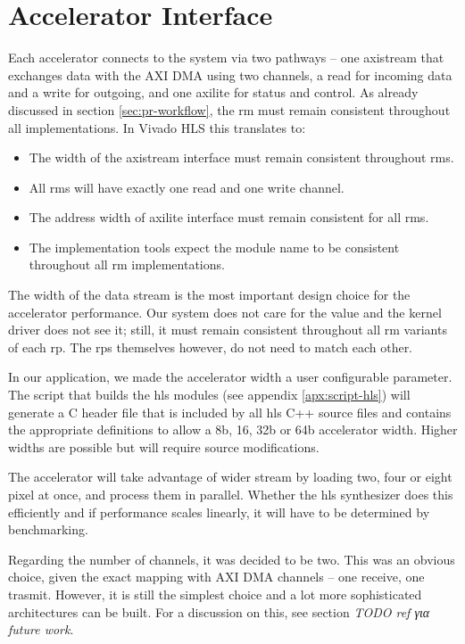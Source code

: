\section{Accelerator Interface}

Each accelerator connects to the system via two pathways -- one \gls{axistream} that 
exchanges data with the AXI DMA using two channels, a read for incoming data and
a write for outgoing, and one \gls{axilite} for status and control.
As already discussed in section \ref{sec:pr-workflow}, the \gls{rm} must remain
consistent throughout all implementations. In Vivado HLS this translates to:

\begin{itemize}
\item	The width of the \gls{axistream} interface must remain consistent throughout \glspl{rm}.
\item	All \glspl{rm} will have exactly one read and one write channel. 
\item	The address width of \gls{axilite} interface must remain consistent for all \glspl{rm}.
\item	The implementation tools expect the module name to be consistent throughout
	all \gls{rm} implementations.
\end{itemize}

The width of the data stream is the most important design choice for the accelerator performance.
Our system does not care for the value and the kernel driver does not see it; still,
it must remain consistent throughout all \gls{rm} variants of each \gls{rp}. The \glspl{rp} themselves
however, do not need to match each other.

In our application, we made the accelerator width a user configurable parameter. 
The script that builds the \gls{hls} modules (see appendix \ref{apx:script-hls}) 
will generate a C header file that is included by all \gls{hls} C++ source files
and contains the appropriate definitions to allow a 8b, 16, 32b or 64b accelerator width.
Higher widths are possible but will require source modifications.

The accelerator will take advantage of wider stream by loading two, four or eight pixel at once,
and process them in parallel. Whether the \gls{hls} synthesizer does this efficiently and 
if performance scales linearly, it will have to be determined by benchmarking.

Regarding the number of channels, it was decided to be two. This was an obvious choice,
given the exact mapping with AXI DMA channels -- one receive, one trasmit. 
However, it is still the simplest choice and a lot more sophisticated architectures
can be built. For a discussion on this, see section \emph{TODO ref για future work}.

